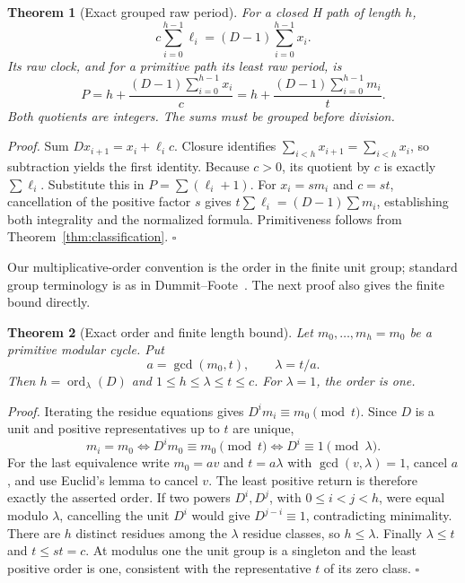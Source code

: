 \documentclass[11pt,letterpaper]{article}
\newtheorem{theorem}{Theorem}
\newenvironment{proof}{\noindent\textit{Proof.}}{\hfill\(\square\)}
\begin{document}
\begin{theorem}[Exact grouped raw period]
\label{thm:clock}
For a closed H path of length $h$,
\[
c\sum_{i=0}^{h-1}\ell_i=(D-1)\sum_{i=0}^{h-1}x_i.
\]
Its raw clock, and for a primitive path its least raw period, is
\[
P=h+\frac{(D-1)\sum_{i=0}^{h-1}x_i}{c}
 =h+\frac{(D-1)\sum_{i=0}^{h-1}m_i}{t}.
\]
Both quotients are integers. The sums must be grouped before division.
\end{theorem}
\begin{proof}
Sum $Dx_{i+1}=x_i+\ell_i c$. Closure identifies
$\sum_{i<h}x_{i+1}=\sum_{i<h}x_i$, so subtraction yields the first identity.
Because $c>0$, its quotient by $c$ is exactly $\sum\ell_i$. Substitute this
in $P=\sum(\ell_i+1)$. For $x_i=sm_i$ and $c=st$, cancellation of the
positive factor $s$ gives $t\sum\ell_i=(D-1)\sum m_i$, establishing both
integrality and the normalized formula. Primitiveness follows from
Theorem~\ref{thm:classification}.
\end{proof}

Our multiplicative-order convention is the order in the finite unit group;
standard group terminology is as in Dummit--Foote~\cite{DummitFoote04}.
The next proof also gives the finite bound directly.

\begin{theorem}[Exact order and finite length bound]
\label{thm:order}
Let $m_0,\ldots,m_h=m_0$ be a primitive modular cycle. Put
\[
a=\gcd(m_0,t),\qquad \lambda=t/a.
\]
Then $h=\operatorname{ord}_{\lambda}(D)$ and $1\le h\le\lambda\le t\le c$.
For $\lambda=1$, the order is one.
\end{theorem}
\begin{proof}
Iterating the residue equations gives $D^i m_i\equiv m_0\pmod t$.
Since $D$ is a unit and positive representatives up to $t$ are unique,
\[
m_i=m_0
\iff D^i m_0\equiv m_0\pmod t
\iff D^i\equiv1\pmod\lambda.
\]
For the last equivalence write $m_0=av$ and $t=a\lambda$ with
$\gcd(v,\lambda)=1$, cancel $a$, and use Euclid's lemma to cancel $v$.
The least positive return is therefore exactly the asserted order.
If two powers $D^i,D^j$, with $0\le i<j<h$, were equal modulo $\lambda$,
cancelling the unit $D^i$ would give $D^{j-i}\equiv1$, contradicting
minimality. There are $h$ distinct residues among the $\lambda$ residue
classes, so $h\le\lambda$. Finally $\lambda\le t$ and $t\le st=c$.
At modulus one the unit group is a singleton and the least positive order
is one, consistent with the representative $t$ of its zero class.
\end{proof}
\end{document}
